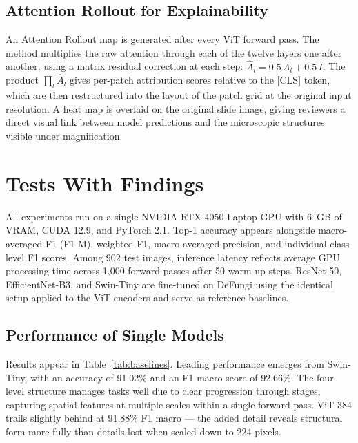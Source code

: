 \documentclass[conference]{IEEEtran}
\begin{document}
\subsection{Attention Rollout for Explainability}

An Attention Rollout map \cite{abnar2020} is generated after every ViT forward
pass. The method multiplies the raw attention through each of the twelve layers
one after another, using a matrix residual correction at each step:
$\hat{A}_l = 0.5\,A_l + 0.5\,I$. The product $\prod_l \hat{A}_l$ gives
per-patch attribution scores relative to the [CLS] token, which are then
restructured into the layout of the patch grid at the original input
resolution. A heat map is overlaid on the original slide image, giving
reviewers a direct visual link between model predictions and the microscopic
structures visible under magnification.

\vspace{-2pt}
\section{Tests With Findings}

All experiments run on a single NVIDIA RTX 4050 Laptop GPU with 6~GB of VRAM,
CUDA 12.9, and PyTorch 2.1. Top-1 accuracy appears alongside macro-averaged
F1 (F1-M), weighted F1, macro-averaged precision, and individual class-level
F1 scores. Among 902 test images, inference latency reflects average GPU
processing time across 1,000 forward passes after 50 warm-up steps. ResNet-50,
EfficientNet-B3, and Swin-Tiny are fine-tuned on DeFungi using the identical
setup applied to the ViT encoders and serve as reference baselines.

\subsection{Performance of Single Models}

Results appear in Table~\ref{tab:baselines}. Leading performance emerges from
Swin-Tiny, with an accuracy of 91.02\% and an F1 macro score of 92.66\%. The
four-level structure manages tasks well due to clear progression through
stages, capturing spatial features at multiple scales within a single forward
pass. ViT-384 trails slightly behind at 91.88\% F1 macro --- the added detail
reveals structural form more fully than details lost when scaled down to 224
pixels.
\end{document}
